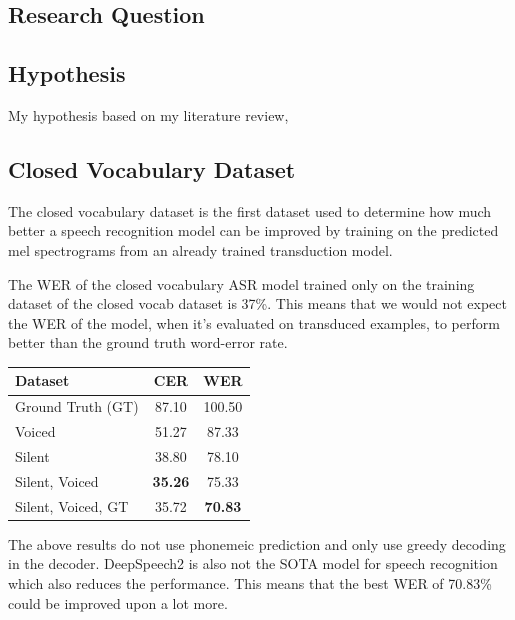 \subsection{Research Question}



\subsection{Hypothesis}

My hypothesis based on my literature review, 

\subsection{Closed Vocabulary Dataset}

The closed vocabulary dataset is the first dataset used to determine how much better
a speech recognition model can be improved by training on the predicted mel spectrograms
from an already trained transduction model.

The WER of the closed vocabulary ASR model trained only on the training dataset
of the closed vocab dataset is 37\%. This means that we would not expect the WER
of the model, when it's evaluated on transduced examples, to perform better than
the ground truth word-error rate.

{\small\begin{center}
\begin{tabular} {  l  c  c  }
\hline
\textbf{Dataset} & \textbf{CER} & \textbf{WER} \\
\hline
Ground Truth (GT) & 87.10 & 100.50 \\
Voiced & 51.27 & 87.33 \\
Silent & 38.80 & 78.10 \\
Silent, Voiced & \textbf{35.26} & 75.33 \\
\hline
Silent, Voiced, GT & 35.72 & \textbf{70.83} \\
\hline
\end{tabular}
\end{center}}

The above results do not use phonemeic prediction and only use greedy decoding
in the decoder. DeepSpeech2 is also not the SOTA model for speech recognition
which also reduces the performance. This means that the best WER of 70.83\% could
be improved upon a lot more.

